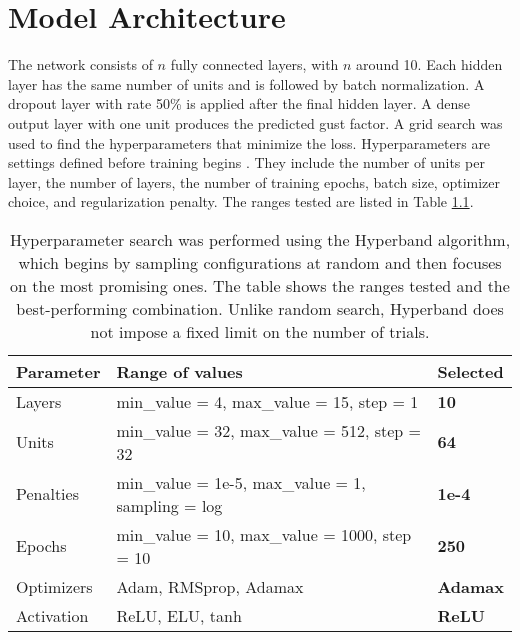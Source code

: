 
\chapter{Model Architecture}

\label{Chapter3}

The network consists of $n$ fully connected layers, with $n$ around 10. Each hidden layer has the same number of units and is followed by batch normalization. A dropout layer with rate 50\% is applied after the final hidden layer. A dense output layer with one unit produces the predicted gust factor. A grid search was used to find the hyperparameters that minimize the loss. Hyperparameters are settings defined before training begins \cite{hyperparameters_definition}. They include the number of units per layer, the number of layers, the number of training epochs, batch size, optimizer choice, and regularization penalty. The ranges tested are listed in Table \ref{table:gridSearchHyperparameters}.


\begin{table}[h]
    \centering
    \caption[Hyperparameter search with Hyperband]{Hyperparameter search was performed using the Hyperband algorithm, which begins by sampling configurations at random and then focuses on the most promising ones. The table shows the ranges tested and the best-performing combination. Unlike random search, Hyperband does not impose a fixed limit on the number of trials.}
    \label{table:gridSearchHyperparameters}
    \begin{tabular}{lll}
        \toprule
        Parameter & Range of values & Selected\\
        \midrule
        Layers &  min\_value = 4, max\_value = 15, step = 1 & \textbf{10}\\
        Units &  min\_value = 32, max\_value = 512, step = 32 & \textbf{64}\\
        Penalties & min\_value = 1e-5, max\_value = 1, sampling = log & \textbf{1e-4}\\
        Epochs & min\_value = 10, max\_value = 1000, step = 10 & \textbf{250}\\
        Optimizers & Adam, RMSprop, Adamax & \textbf{Adamax}\\
        Activation & ReLU, ELU, tanh & \textbf{ReLU}\\
        \bottomrule
    \end{tabular}
\end{table}


